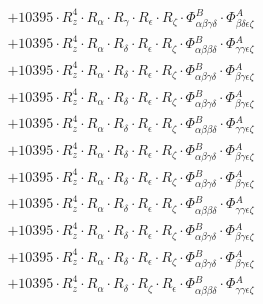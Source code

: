 \documentclass{article}
\begin{document}
\begin{subequations}
\begin{gather}
\begin{array}{c}
 \\[0.2em] 		 + 10395 \cdot R_{z}^{4} \cdot R_{\alpha{}} \cdot R_{\gamma{}} \cdot R_{\epsilon{}} \cdot R_{\zeta{}} \cdot \Phi{}^{B}_{\alpha{}\beta{}\gamma{}\delta{}} \cdot \Phi{}^{A}_{\beta{}\delta{}\epsilon{}\zeta{}} 
 \\[0.2em] 		 + 10395 \cdot R_{z}^{4} \cdot R_{\alpha{}} \cdot R_{\delta{}} \cdot R_{\epsilon{}} \cdot R_{\zeta{}} \cdot \Phi{}^{B}_{\alpha{}\beta{}\beta{}\delta{}} \cdot \Phi{}^{A}_{\gamma{}\gamma{}\epsilon{}\zeta{}} 
 \\[0.2em] 		 + 10395 \cdot R_{z}^{4} \cdot R_{\alpha{}} \cdot R_{\delta{}} \cdot R_{\epsilon{}} \cdot R_{\zeta{}} \cdot \Phi{}^{B}_{\alpha{}\beta{}\gamma{}\delta{}} \cdot \Phi{}^{A}_{\beta{}\gamma{}\epsilon{}\zeta{}} 
 \\[0.2em] 		 + 10395 \cdot R_{z}^{4} \cdot R_{\alpha{}} \cdot R_{\delta{}} \cdot R_{\epsilon{}} \cdot R_{\zeta{}} \cdot \Phi{}^{B}_{\alpha{}\beta{}\gamma{}\delta{}} \cdot \Phi{}^{A}_{\beta{}\gamma{}\epsilon{}\zeta{}} 
 \\[0.2em] 		 + 10395 \cdot R_{z}^{4} \cdot R_{\alpha{}} \cdot R_{\delta{}} \cdot R_{\epsilon{}} \cdot R_{\zeta{}} \cdot \Phi{}^{B}_{\alpha{}\beta{}\beta{}\delta{}} \cdot \Phi{}^{A}_{\gamma{}\gamma{}\epsilon{}\zeta{}} 
 \\[0.2em] 		 + 10395 \cdot R_{z}^{4} \cdot R_{\alpha{}} \cdot R_{\delta{}} \cdot R_{\epsilon{}} \cdot R_{\zeta{}} \cdot \Phi{}^{B}_{\alpha{}\beta{}\gamma{}\delta{}} \cdot \Phi{}^{A}_{\beta{}\gamma{}\epsilon{}\zeta{}} 
 \\[0.2em] 		 + 10395 \cdot R_{z}^{4} \cdot R_{\alpha{}} \cdot R_{\delta{}} \cdot R_{\epsilon{}} \cdot R_{\zeta{}} \cdot \Phi{}^{B}_{\alpha{}\beta{}\gamma{}\delta{}} \cdot \Phi{}^{A}_{\beta{}\gamma{}\epsilon{}\zeta{}} 
 \\[0.2em] 		 + 10395 \cdot R_{z}^{4} \cdot R_{\alpha{}} \cdot R_{\delta{}} \cdot R_{\epsilon{}} \cdot R_{\zeta{}} \cdot \Phi{}^{B}_{\alpha{}\beta{}\beta{}\delta{}} \cdot \Phi{}^{A}_{\gamma{}\gamma{}\epsilon{}\zeta{}} 
 \\[0.2em] 		 + 10395 \cdot R_{z}^{4} \cdot R_{\alpha{}} \cdot R_{\delta{}} \cdot R_{\epsilon{}} \cdot R_{\zeta{}} \cdot \Phi{}^{B}_{\alpha{}\beta{}\gamma{}\delta{}} \cdot \Phi{}^{A}_{\beta{}\gamma{}\epsilon{}\zeta{}} 
 \\[0.2em] 		 + 10395 \cdot R_{z}^{4} \cdot R_{\alpha{}} \cdot R_{\delta{}} \cdot R_{\epsilon{}} \cdot R_{\zeta{}} \cdot \Phi{}^{B}_{\alpha{}\beta{}\gamma{}\delta{}} \cdot \Phi{}^{A}_{\beta{}\gamma{}\epsilon{}\zeta{}} 
 \\[0.2em] 		 + 10395 \cdot R_{z}^{4} \cdot R_{\alpha{}} \cdot R_{\delta{}} \cdot R_{\zeta{}} \cdot R_{\epsilon{}} \cdot \Phi{}^{B}_{\alpha{}\beta{}\beta{}\delta{}} \cdot \Phi{}^{A}_{\gamma{}\gamma{}\epsilon{}\zeta{}} 

\end{array}
\end{gather}
\end{subequations}
\end{document}
